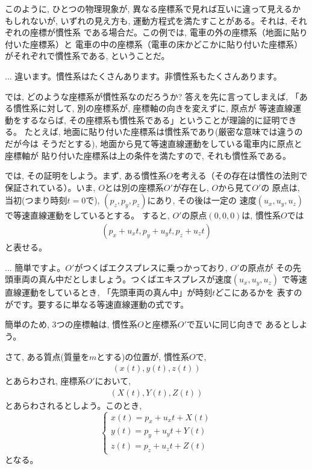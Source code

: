 このように, ひとつの物理現象が, 異なる座標系で見れば互いに違って見えるかもしれないが, 
いずれの見え方も, 運動方程式を満たすことがある。それは, それぞれの座標が慣性系
である場合だ。この例では, 電車の外の座標系（地面に貼り付いた座標系）と
電車の中の座標系（電車の床かどこかに貼り付いた座標系）がそれぞれで慣性系である, 
ということだ。

\begin{faq}{\small{}
... 違います。慣性系はたくさんあります。非慣性系もたくさんあります。}\end{faq}

では, どのような座標系が慣性系なのだろうか? 答えを先に言ってしまえば, 
「ある慣性系に対して, 別の座標系が, 座標軸の向きを変えずに, 原点が
等速直線運動をするならば, その座標系も慣性系である」ということが理論的に証明できる。
たとえば, 地面に貼り付いた座標系は慣性系であり(厳密な意味では違うのだが今は
そうだとする), 地面から見て等速直線運動をしている電車内に原点と座標軸が
貼り付いた座標系は上の条件を満たすので, それも慣性系である。

では, その証明をしよう。まず, ある慣性系$O$を考える（その存在は慣性の法則で
保証されている）。いま, $O$とは別の座標系$O'$が存在し, $O$から見て$O'$の
原点は, 当初(つまり時刻$t=0$で), $(p_z, p_y, p_z)$にあり, その後は一定の
速度$(u_x, u_y, u_z)$で等速直線運動をしているとする。
すると, $O'$の原点$(0, 0, 0)$は, 慣性系$O$では
\begin{eqnarray}
(p_x+u_xt, p_y+u_yt, p_z+u_zt)\label{eq:origin_move0}
\end{eqnarray}
と表せる。

\begin{faq}{\small{}
... 簡単ですよ。$O'$がつくばエクスプレスに乗っかっており, $O'$の原点が
その先頭車両の真ん中だとしましょう。つくばエキスプレスが速度$(u_x, u_y, u_z)$
で等速直線運動をしているとき, 「先頭車両の真ん中」が時刻$t$どこにあるかを
表すのがです。要するに単なる等速直線運動の式です。
}\end{faq}

簡単のため, 3つの座標軸は, 慣性系$O$と座標系$O'$で互いに同じ向きで
あるとしよう。

さて, ある質点(質量を$m$とする)の位置が, 慣性系$O$で, 
\begin{eqnarray}(x(t), y(t), z(t))\end{eqnarray}
とあらわされ, 座標系$O'$において, 
\begin{eqnarray}(X(t), Y(t), Z(t))\label{eq:coordinate_O'}\end{eqnarray}
とあらわされるとしよう。このとき, 
\begin{equation}\begin{cases}
x(t)=p_x+u_xt+X(t)\\
y(t)=p_y+u_yt+Y(t)\\
z(t)=p_z+u_zt+Z(t)
\end{cases}\label{eq:origin_move2}
\end{equation}
となる。

